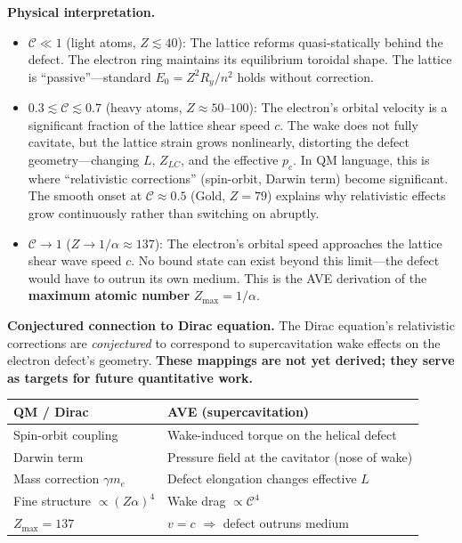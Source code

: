 \noindent\textbf{Physical interpretation.}
\begin{itemize}
\item $\mathcal{C} \ll 1$ (light atoms, $Z \lesssim 40$):
      The lattice reforms quasi-statically behind the defect.
      The electron ring maintains its equilibrium toroidal
      shape.  The lattice is ``passive''---standard
      $E_0 = Z^2 R_y / n^2$ holds without correction.
\item $0.3 \lesssim \mathcal{C} \lesssim 0.7$ (heavy atoms, $Z \approx 50$--$100$):
      The electron's orbital velocity is a significant fraction
      of the lattice shear speed $c$.  The wake does not fully
      cavitate, but the lattice strain grows nonlinearly,
      distorting the defect geometry---changing $L$, $Z_{LC}$,
      and the effective $p_c$.  In QM language, this is where
      ``relativistic corrections'' (spin-orbit, Darwin term)
      become significant.  The smooth onset at $\mathcal{C} \approx 0.5$
      (Gold, $Z = 79$) explains why relativistic effects grow
      continuously rather than switching on abruptly.
\item $\mathcal{C} \to 1$ ($Z \to 1/\alpha \approx 137$):
      The electron's orbital speed approaches the lattice
      shear wave speed $c$.  No bound state can
      exist beyond this limit---the defect would have to outrun
      its own medium.  This is the AVE derivation of the
      \textbf{maximum atomic number} $Z_{\max} = 1/\alpha$.
\end{itemize}

\noindent\textbf{Conjectured connection to Dirac equation.}
The Dirac equation's relativistic corrections are
\emph{conjectured} to correspond to supercavitation wake
effects on the electron defect's geometry.
\textbf{These mappings are not yet derived; they serve as
targets for future quantitative work.}
\begin{center}
\small
\begin{tabular}{ll}
\hline
\textbf{QM / Dirac} & \textbf{AVE (supercavitation)} \\
\hline
Spin-orbit coupling
    & Wake-induced torque on the helical defect \\
Darwin term
    & Pressure field at the cavitator (nose of wake) \\
Mass correction $\gamma m_e$
    & Defect elongation changes effective $L$ \\
Fine structure $\propto (Z\alpha)^4$
    & Wake drag $\propto \mathcal{C}^4$ \\
$Z_{\max} = 137$
    & $v = c$ $\Rightarrow$ defect outruns medium \\
\hline
\end{tabular}
\end{center}


